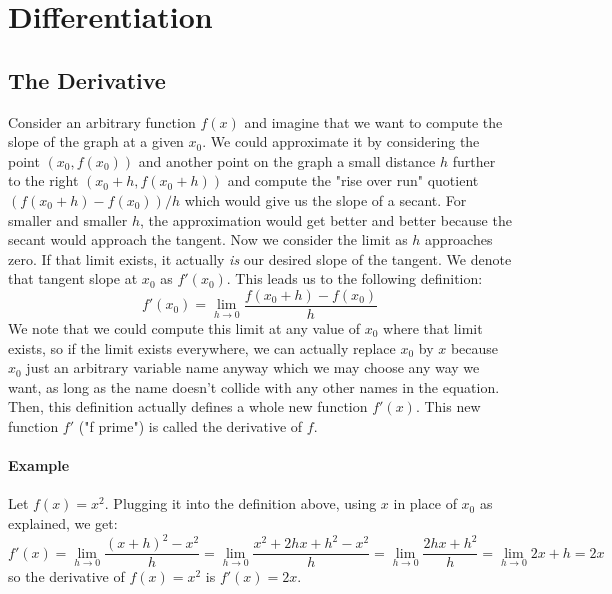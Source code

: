\section{Differentiation}

\subsection{The Derivative}
Consider an arbitrary function $f(x)$ and imagine that we want to compute the slope of the graph at a given $x_0$. We could approximate it by considering the point $(x_0, f(x_0))$ and another point on the graph a small distance $h$ further to the right $(x_0+h, f(x_0+h))$ and compute the "rise over run" quotient $(f(x_0+h) - f(x_0)) / h$ which would give us the slope of a secant. For smaller and smaller $h$, the approximation would get better and better because the secant would approach the tangent. Now we consider the limit as $h$ approaches zero. If that limit exists, it actually \emph{is} our desired slope of the tangent. We denote that tangent slope at $x_0$ as $f'(x_0)$. This leads us to the following definition:
\begin{equation}
\label{Eq:Derivative}
  f'(x_0) = \lim_{h \rightarrow 0} \frac{f(x_0 + h) - f(x_0)}{h}
\end{equation}
We note that we could compute this limit at any value of $x_0$ where that limit exists, so if the limit exists everywhere, we can actually replace $x_0$ by $x$ because $x_0$ just an arbitrary variable name anyway which we may choose any way we want, as long as the name doesn't collide with any other names in the equation. Then, this definition actually defines a whole new function $f'(x)$. This new function $f'$ ("f prime") is called the derivative of $f$.

\paragraph{Example} Let $f(x) = x^2$. Plugging it into the definition above, using $x$ in place of $x_0$ as explained, we get:
\begin{equation}
  f'(x) = \lim_{h \rightarrow 0} \frac{(x + h)^2 - x^2}{h}
        = \lim_{h \rightarrow 0} \frac{x^2 + 2 h x + h^2 - x^2}{h} 
        = \lim_{h \rightarrow 0} \frac{2 h x + h^2}{h} 
        = \lim_{h \rightarrow 0} 2 x + h
        = 2 x
\end{equation}
so the derivative of $f(x) = x^2$ is $f'(x) = 2 x$.

